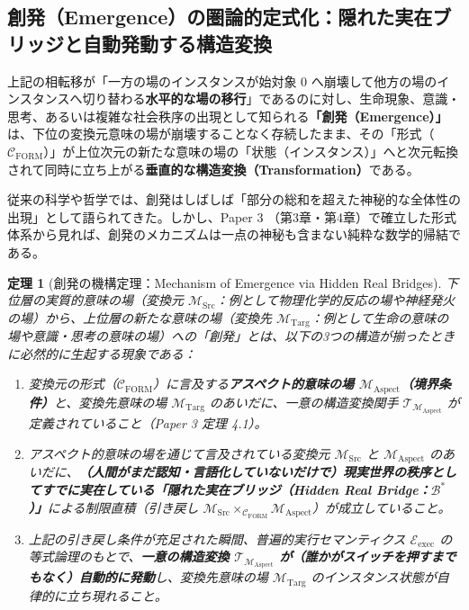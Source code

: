 \documentclass[11pt,a4paper]{ltjsarticle}
\theoremstyle{definition}
\theoremstyle{plain}
\newtheorem{theorem}{定理}[section]
\begin{document}
\subsection{創発（Emergence）の圏論的定式化：隠れた実在ブリッジと自動発動する構造変換}
上記の相転移が「一方の場のインスタンスが始対象 $0$ へ崩壊して他方の場のインスタンスへ切り替わる\textbf{水平的な場の移行}」であるのに対し、生命現象、意識・思考、あるいは複雑な社会秩序の出現として知られる\textbf{「創発（Emergence）」}は、下位の変換元意味の場が崩壊することなく存続したまま、その「形式（$\mathcal{C}_{\mathrm{FORM}}$）」が上位次元の新たな意味の場の「状態（インスタンス）」へと次元転換されて同時に立ち上がる\textbf{垂直的な構造変換（Transformation）}である。

従来の科学や哲学では、創発はしばしば「部分の総和を超えた神秘的な全体性の出現」として語られてきた。しかし、Paper 3 \cite{Ota2026_3}（第3章・第4章）で確立した形式体系から見れば、創発のメカニズムは一点の神秘も含まない純粋な数学的帰結である。

\begin{theorem}[創発の機構定理：Mechanism of Emergence via Hidden Real Bridges]
下位層の実質的意味の場（変換元 $\mathcal{M}_{\mathrm{Src}}$：例として物理化学的反応の場や神経発火の場）から、上位層の新たな意味の場（変換先 $\mathcal{M}_{\mathrm{Targ}}$：例として生命の意味の場や意識・思考の意味の場）への「創発」とは、以下の3つの構造が揃ったときに必然的に生起する現象である：
\begin{enumerate}
    \item 変換元の形式（$\mathcal{C}_{\mathrm{FORM}}$）に言及する\textbf{アスペクト的意味の場 $\mathcal{M}_{\mathrm{Aspect}}$（境界条件）}と、変換先意味の場 $\mathcal{M}_{\mathrm{Targ}}$ のあいだに、一意の構造変換関手 $\mathcal{T}_{\mathcal{M}_{\mathrm{Aspect}}}$ が定義されていること（Paper 3 \cite{Ota2026_3} 定理 4.1）。
    \item アスペクト的意味の場を通じて言及されている変換元 $\mathcal{M}_{\mathrm{Src}}$ と $\mathcal{M}_{\mathrm{Aspect}}$ のあいだに、\textbf{（人間がまだ認知・言語化していないだけで）現実世界の秩序としてすでに実在している「隠れた実在ブリッジ（Hidden Real Bridge：$\mathcal{B}^*$）」}による制限直積（引き戻し $\mathcal{M}_{\mathrm{Src}} \times_{\mathcal{C}_{\mathrm{FORM}}} \mathcal{M}_{\mathrm{Aspect}}$）が成立していること。
    \item 上記の引き戻し条件が充足された瞬間、普遍的実行セマンティクス $\mathcal{E}_{\mathrm{exec}}$ の等式論理のもとで、\textbf{一意の構造変換 $\mathcal{T}_{\mathcal{M}_{\mathrm{Aspect}}}$ が（誰かがスイッチを押すまでもなく）自動的に発動}し、変換先意味の場 $\mathcal{M}_{\mathrm{Targ}}$ のインスタンス状態が自律的に立ち現れること。
\end{enumerate}
\end{theorem}
\end{document}
